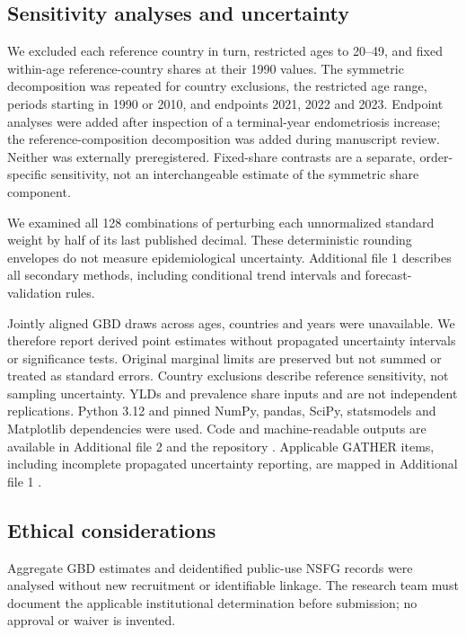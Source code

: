 \documentclass[11pt,a4paper]{article}
\begin{document}

\subsection{Sensitivity analyses and uncertainty}
We excluded each reference country in turn, restricted ages to 20--49, and fixed within-age reference-country shares at their 1990 values. The symmetric decomposition was repeated for country exclusions, the restricted age range, periods starting in 1990 or 2010, and endpoints 2021, 2022 and 2023. Endpoint analyses were added after inspection of a terminal-year endometriosis increase; the reference-composition decomposition was added during manuscript review. Neither was externally preregistered. Fixed-share contrasts are a separate, order-specific sensitivity, not an interchangeable estimate of the symmetric share component.



We examined all 128 combinations of perturbing each unnormalized standard weight by half of its last published decimal. These deterministic rounding envelopes do not measure epidemiological uncertainty. Additional file 1 describes all secondary methods, including conditional trend intervals and forecast-validation rules.

Jointly aligned GBD draws across ages, countries and years were unavailable. We therefore report derived point estimates without propagated uncertainty intervals or significance tests. Original marginal limits are preserved but not summed or treated as standard errors. Country exclusions describe reference sensitivity, not sampling uncertainty. YLDs and prevalence share inputs and are not independent replications. Python 3.12 and pinned NumPy, pandas, SciPy, statsmodels and Matplotlib dependencies were used. Code and machine-readable outputs are available in Additional file 2 and the repository \cite{repository}. Applicable GATHER items, including incomplete propagated uncertainty reporting, are mapped in Additional file 1 \cite{gather}.


\subsection{Ethical considerations}
Aggregate GBD estimates and deidentified public-use NSFG records were analysed without new recruitment or identifiable linkage. The research team must document the applicable institutional determination before submission; no approval or waiver is invented.
\end{document}
